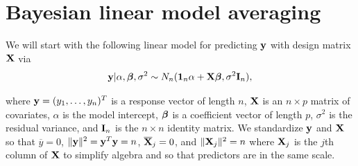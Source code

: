 


\section{Bayesian linear model averaging}
\label{sec:blma}

We will start with the following linear model for predicting ${\bf y}$ with design matrix ${\bf X}$ via
\begin{equation}\label{eq:linearModel}
\displaystyle {\bf y} | \alpha, {\boldsymbol \beta}, \sigma^2 \sim N_n({\bf 1}_n\alpha + {\bf X} {\boldsymbol \beta}, \sigma^2 {\bf I}_n),
\end{equation} 


\noindent where 
${\bf y} = (y_1,\ldots,y_n)^T$ is a response vector of length $n$, ${\bf X}$ is an $n \times p$ matrix 
of covariates,
$\alpha$ is the model intercept, ${\boldsymbol \beta}$ is a coefficient vector of length $p$, 
$\sigma^2$ is the residual variance, and ${\bf I}_n$ is the $n \times n$ identity matrix. 
We standardize ${\bf y}$ and ${\bf X}$ 
so that $\overline{y} = 0$, 
$\|{\bf y}\|^2 = {\bf y}^T{\bf y} = n$, $\overline{{\bf X}}_j = 0$,  and $\|{\bf X}_j\|^2 = n$ where ${\bf X}_j$ is the $j$th 
column of ${\bf X}$ to simplify algebra and so that predictors are in the same scale.

